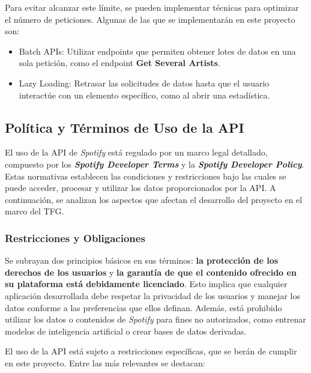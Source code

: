 Para evitar alcanzar este límite, se pueden implementar técnicas para optimizar el número de peticiones. Algunas de las que se implementarán en este proyecto son:

\begin{itemize}
    \item Batch APIs: Utilizar endpoints que permiten obtener lotes de datos en una sola petición, como el endpoint \textbf{Get Several Artists}.
    \item Lazy Loading: Retrasar las solicitudes de datos hasta que el usuario interactúe con un elemento específico, como al abrir una estadística.
\end{itemize}


\subsection{Política y Términos de Uso de la API}

El uso de la API de \textit{Spotify} está regulado por un marco legal detallado, compuesto por los \textit{\textbf{Spotify Developer Terms}} y la \textit{\textbf{Spotify Developer Policy}}. Estas normativas establecen las condiciones y restricciones bajo las cuales se puede acceder, procesar y utilizar los datos proporcionados por la API. A continuación, se analizan los aspectos que afectan el desarrollo del proyecto en el marco del TFG.

\subsubsection{Restricciones y Obligaciones}

Se subrayan dos principios básicos en sus términos: \textbf{la protección de los derechos de los usuarios} y \textbf{la garantía de que el contenido ofrecido en su plataforma está debidamente licenciado}. Esto implica que cualquier aplicación desarrollada debe respetar la privacidad de los usuarios y manejar los datos conforme a las preferencias que ellos definan. Además, está prohibido utilizar los datos o contenidos de \textit{Spotify} para fines no autorizados, como entrenar modelos de inteligencia artificial o crear bases de datos derivadas.

El uso de la API está sujeto a restricciones específicas, que se berán de cumplir en este proyecto. Entre las más relevantes se destacan:

